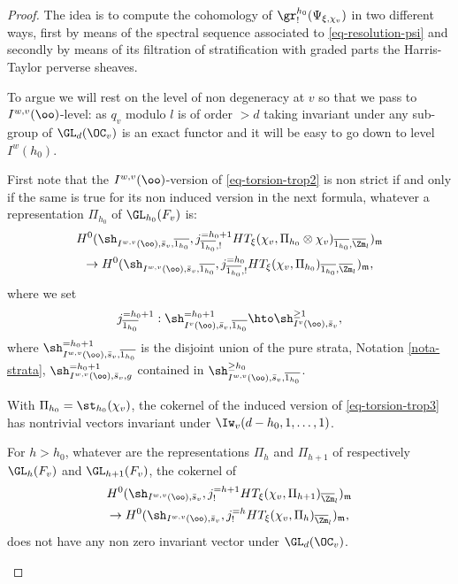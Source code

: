 \begin{proof}
The idea is to compute the cohomology of $\gr^{h_0}_{!}(\Psi_{\xi,\chi_v})$
in two different ways, first by means of the spectral sequence associated to
\eqref{eq-resolution-psi} and secondly by means of its filtration of stratification with graded parts the Harris-Taylor perverse sheaves.

To argue we will rest on the level of non degeneracy at $v$ so that we pass to
$I^{w,v}(\oo)$-level: as $q_v$ modulo $l$ is of order $>d$ taking
invariant under any sub-group of $\GL_d(\OC_v)$ is an exact functor and it
will be easy to go down to level $I^w(h_0)$.

First note that the $I^{w,v}(\oo)$-version of
\eqref{eq-torsion-trop2} is non strict
if and only if the same is true for its non induced version in the next formula,
whatever a representation $\Pi_{h_0}$ of $\GL_{h_0}(F_v)$ is:\vspace*{-3pt}
\begin{multline} \label{eq-torsion-trop3}
H^{0}(\sh_{I^{w,v}(\oo),\bar s_v,\overline{1_{h_0}}},j^{=h_0+1}_{\overline{1_{h_0}},!} HT_{\xi}
(\chi_v,\Pi_{h_0} \otimes \chi_v)_{\overline{1_{h_0}},\overline \Zm_l})_{\mathfrak m} \\
\to H^0(\sh_{I^{w,v}(\oo),\bar s_v,\overline{1_{h_0}}},j^{=h_0}_{\overline{1_{h_0}},!}
HT_{\xi}(\chi_v,\Pi_{h_0})_{\overline{1_{h_0}},\overline \Zm_l})_{\mathfrak m},
\end{multline}
where we set
\[
j^{=h_0+1}_{\overline{1_{h_0}}}:
\sh^{=h_0+1}_{I^v(\oo),\bar s_v,\overline{1_{h_0}}}
\hto \sh^{\geq 1}_{I^v(\oo),\bar s_v},
\]
where $\sh^{=h_0+1}_{I^{w,v}(\oo),\bar s_v,\overline{1_{h_0}}}$ is the
disjoint union of the pure strata, \cf Notation \ref{nota-strata},
$\sh^{=h_0+1}_{I^{w,v}(\oo),\bar s_v,g}$
contained in $\sh^{\geq h_0}_{I^{w,v}(\oo),\bar s_v,\overline{1_{h_0}}}$.

\skpt
\begin{lemma} \label{lem-facts0}
\begin{enumeratei}
\item\label{lem-facts0i} With $\Pi_{h_0}=\st_{h_0}(\chi_v)$, the cokernel of the induced version of
\eqref{eq-torsion-trop3} has nontrivial vectors invariant
under $\Iw_v(d-h_0,1,\dots,1)$.

\item\label{lem-facts0ii} For $h > h_0$, whatever are the representations $\Pi_h$ and
$\Pi_{h+1}$ of respectively $\GL_h(F_v)$ and $\GL_{h+1}(F_v)$, the cokernel of
\begin{multline} \label{eq-torsion-trop-h}
H^{0}(\sh_{I^{w,v}(\oo),\bar s_v},j^{=h+1}_!
HT_\xi(\chi_v,\Pi_{h+1})_{\overline \Zm_l})_{\mathfrak m} \\
\to H^0(\sh_{I^{w,v}(\oo),\bar s_v},j^{=h}_!
HT_\xi(\chi_v,\Pi_h)_{\overline \Zm_l})_{\mathfrak m},
\end{multline}
does not have any non zero invariant vector under $\GL_d(\OC_v)$.


\end{enumeratei}
\end{lemma}
\end{proof}
